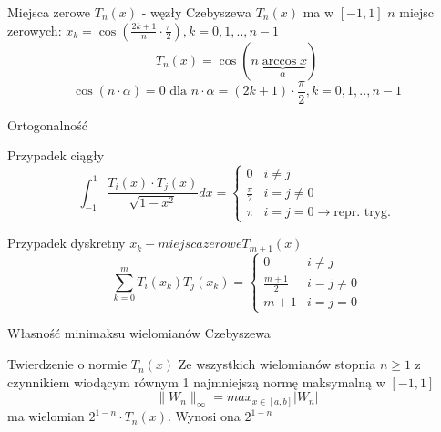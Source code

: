 \begin{frame}{Miejsca zerowe $T_n(x)$ - węzły Czebyszewa}
	$T_n(x)$ ma w $[-1,1]$ $n$ miejsc zerowych:\newline
    $x_k = \cos (\frac{2k+1}{n} \cdot \frac{\pi}{2}), k=0,1,..,n-1$
    $$T_n(x) = \cos(n \underbrace{\arccos x}_\alpha)$$
    $$\cos(n \cdot \alpha) = 0 \text{ dla } n \cdot \alpha = (2k+1) \cdot \frac{\pi}{2},k=0,1,..,n-1$$
\end{frame}
\begin{frame}{Ortogonalność}
	\begin{block}{Przypadek ciągły}
		$$\int_{-1}^{1}\frac{T_i(x) \cdot T_j(x)}{\sqrt{1-x^2}}dx = \left\{\begin{array}{lc}
			0 & i \not= j \\
            \frac{\pi}{2} & i = j \not= 0 \\
            \pi & i = j = 0 \rightarrow \text{repr. tryg.}
		\end{array}\right.$$
	\end{block}
    
    \begin{block}{Przypadek dyskretny $x_k - miejsca zerowe T_{m+1}(x)$}
    $$\sum_{k=0}^{m}T_i(x_k)T_j(x_k) = \left\{\begin{array}{rc}
    	0 & i \not= j \\
        \frac{m+1}{2} & i=j \not= 0 \\
        m+1 & i=j=0
    \end{array}\right.$$
    \end{block}
\end{frame}
\begin{frame}{Własność minimaksu wielomianów Czebyszewa}
	\begin{block}{Twierdzenie o normie $T_n(x)$}
		Ze wszystkich wielomianów stopnia $n\geqslant1$ z czynnikiem wiodącym równym 1 najmniejszą normę maksymalną w $[-1,1]$
        $$\lVert W_n \rVert _{\infty} = max_{x \in [a,b]}|W_n|$$
        ma wielomian $2^{1-n} \cdot T_n(x)$. Wynosi ona $2^{1-n}$
	\end{block}
\end{frame}
